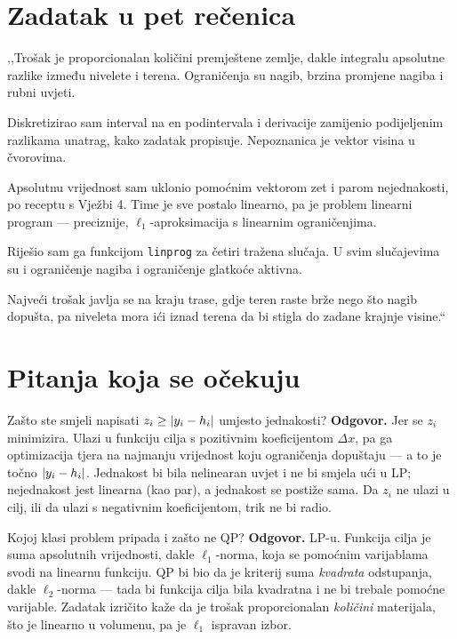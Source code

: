 \section{Zadatak u pet rečenica}
\label{sec:z3o-sazetak}

\begin{izgovor}
,,Trošak je proporcionalan količini premještene zemlje, dakle integralu
apsolutne razlike između nivelete i terena. Ograničenja su nagib, brzina promjene
nagiba i rubni uvjeti.

Diskretizirao sam interval na en podintervala i derivacije zamijenio podijeljenim
razlikama unatrag, kako zadatak propisuje. Nepoznanica je vektor visina u
čvorovima.

Apsolutnu vrijednost sam uklonio pomoćnim vektorom zet i parom nejednakosti, po
receptu s Vježbi 4. Time je sve postalo linearno, pa je problem linearni program
--- preciznije, $\ell_1$-aproksimacija s linearnim ograničenjima.

Riješio sam ga funkcijom \texttt{linprog} za četiri tražena slučaja. U svim
slučajevima su i ograničenje nagiba i ograničenje glatkoće aktivna.

Najveći trošak javlja se na kraju trase, gdje teren raste brže nego što nagib
dopušta, pa niveleta mora ići iznad terena da bi stigla do zadane krajnje visine.``
\end{izgovor}

\section{Pitanja koja se očekuju}
\label{sec:z3o-pitanja}

\begin{pitanje}{Zašto ste smjeli napisati $z_i \geq \left\lvert y_i - h_i \right\rvert$ umjesto jednakosti?}
\textbf{Odgovor.} Jer se $z_i$ minimizira. Ulazi u funkciju cilja s pozitivnim
koeficijentom $\Delta x$, pa ga optimizacija tjera na najmanju vrijednost koju
ograničenja dopuštaju --- a to je točno $\left\lvert y_i - h_i \right\rvert$. Jednakost bi bila
nelinearan uvjet i ne bi smjela ući u LP; nejednakost jest linearna (kao par),
a jednakost se postiže sama. Da $z_i$ ne ulazi u cilj, ili da ulazi s negativnim
koeficijentom, trik ne bi radio.
\end{pitanje}

\begin{pitanje}{Kojoj klasi problem pripada i zašto ne QP?}
\textbf{Odgovor.} LP-u. Funkcija cilja je suma apsolutnih vrijednosti, dakle
$\ell_1$-norma, koja se pomoćnim varijablama svodi na linearnu funkciju. QP bi
bio da je kriterij suma \emph{kvadrata} odstupanja, dakle $\ell_2$-norma --- tada
bi funkcija cilja bila kvadratna i ne bi trebale pomoćne varijable. Zadatak
izričito kaže da je trošak proporcionalan \emph{količini} materijala, što je
linearno u volumenu, pa je $\ell_1$ ispravan izbor.
\end{pitanje}

